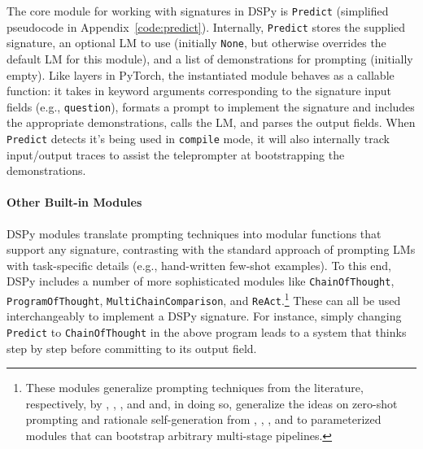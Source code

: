 The core module for working with signatures in DSPy is \texttt{Predict} (simplified pseudocode in {Appendix~\ref{code:predict}}). Internally, \texttt{Predict} stores the supplied signature, an optional LM to use (initially \texttt{None}, but otherwise overrides the default LM for this module), and a list of demonstrations for prompting (initially empty). Like layers in PyTorch, the instantiated module behaves as a callable function: it takes in keyword arguments corresponding to the signature input fields (e.g., \texttt{question}), formats a prompt to implement the signature and includes the appropriate demonstrations, calls the LM, and parses the output fields. When \texttt{Predict} detects it's being used in \texttt{compile} mode, it will also internally track input/output traces to assist the teleprompter at bootstrapping the demonstrations.










\vspace{2mm}

\paragraph{Other Built-in Modules}

DSPy modules translate prompting techniques into modular functions that support any signature, contrasting with the standard approach of prompting LMs with task-specific details (e.g., hand-written few-shot examples). To this end, DSPy includes a number of more sophisticated modules like \texttt{ChainOfThought}, \texttt{ProgramOfThought}, \texttt{MultiChainComparison}, and \texttt{ReAct}.\footnote{These modules generalize prompting techniques from the literature, respectively, by \citet{wei2022chain}, \citet{chen2022program}, \citet{yoran2023answering}, and \citet{yao2022react} and, in doing so, generalize the ideas on zero-shot prompting and rationale self-generation from \citet{kojima2022large}, \citet{zelikman2022star}, \citet{zhang2022automatic}, and \citet{huang2022large} to parameterized modules that can bootstrap arbitrary multi-stage pipelines.} These can all be used interchangeably to implement a DSPy signature. For instance, simply changing \texttt{Predict} to \texttt{ChainOfThought} in the above program leads to a system that thinks step by step before committing to its output field.

